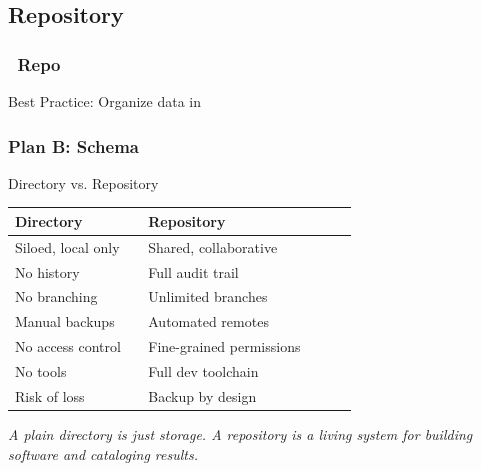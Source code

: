 \subsection{Repository}
%
\begin{frame}\frametitle{\gitlab\ Repo}
\center
	Best Practice: Organize data in \gitlab
\end{frame}
%
%
%
\begin{frame}\frametitle{Plan B: Schema}
\end{frame}
%
\begin{frame}{Directory vs. Repository}
    \begin{table}
    \centering
    \begin{tabular}{p{0.35\linewidth} p{0.55\linewidth}}
        \textbf{Directory} & \textbf{Repository} \\
        \hline
        Siloed, local only & Shared, collaborative \\
        No history & Full audit trail \\
        No branching & Unlimited branches \\
        Manual backups & Automated remotes \\
        No access control & Fine-grained permissions \\
        No tools & Full dev toolchain \\
        Risk of loss & Backup by design \\
    \end{tabular}
    \end{table}
    
    \vspace{1em}
    \begin{center}
        \textit{A plain directory is just storage. A repository is a living system for building software and cataloging results.}
    \end{center}
\end{frame}

